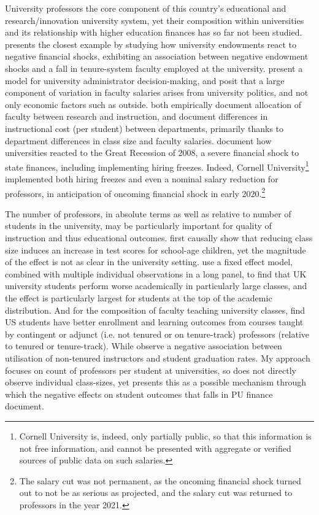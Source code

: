 \documentclass[notitlepage,12pt]{article}
\begin{document}
University professors the core component of this country's educational and research/innovation university system, yet their composition within universities and its relationship with higher education finances has so far not been studied.
\cite{brown2014endowment} presents the closest example by studying how university endowments react to negative financial shocks, exhibiting an association between negative endowment shocks and a fall in tenure-system faculty employed at the university.
\cite{abe2015implications} present a model for university administrator decision-making, and posit that a large component of variation in faculty salaries arises from university politics, and not only economic factors such as outside.
\cite{johnson2009jep,NBERc13879} both empirically document allocation of faculty between research and instruction, and \cite{hemelt2021math} document differences in instructional cost (per student) between departments, primarily thanks to department differences in class size and faculty salaries.
\cite{turner2014impact} document how universities reacted to the Great Recession of 2008, a severe financial shock to state finances, including implementing hiring freezes.
Indeed, Cornell University\footnote{
    Cornell University is, indeed, only partially public, so that this information is not free information, and cannot be presented with aggregate or verified sources of public data on such salaries.
} implemented both hiring freezes and even a nominal salary reduction for professors, in anticipation of oncoming financial shock in early 2020.\footnote{
    The salary cut was not permanent, as the oncoming financial shock turned out to not be as serious as projected, and the salary cut was returned to professors in the year 2021.
}

The number of professors, in absolute terms as well as relative to number of students in the university, may be particularly important for quality of instruction and thus educational outcomes.
\cite{angrist1999using} first causally show that reducing class size induces an increase in test scores for school-age children, yet the magnitude of the effect is not as clear in the university setting.
\cite{bandiera2010heterogeneous} use a fixed effect model, combined with multiple individual observations in a long panel, to find that UK university students perform worse academically in particularly large classes, and the effect is particularly largest for students at the top of the academic distribution.
And for the composition of faculty teaching university classes, 
\cite{bettinger2010does,figlio2015tenure} find US students have better enrollment and learning outcomes from courses taught by contingent or adjunct (i.e. not tenured or on tenure-track) professors (relative to tenured or tenure-track).
While \cite{ehrenberg2005tenured} observe a negative association between utilisation of non-tenured instructors and student graduation rates.
My approach focuses on count of professors per student at universities, so does not directly observe individual class-sizes, yet presents this as a possible mechanism through which the negative effects on student outcomes that falls in PU finance \cite{NBERw23736,NBERw27885} document.
\end{document}
